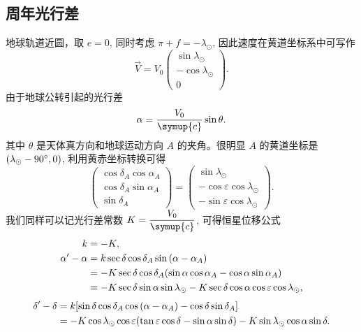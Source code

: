 \documentclass[UTF8, 12pt, a4paper, oneside, onecolumn, fontset=none]{ctexart}
\begin{document}
\subsection{周年光行差}
地球轨道近圆，取 $e=0$, 同时考虑 $\pi+f=-\lambda_{\odot}$, 因此速度在黄道坐标系中可写作
\begin{equation}
\vec{V}=V_{0}\begin{pmatrix}
\sin{\lambda_{\odot}}\\
-\cos{\lambda_{\odot}}\\
0
\end{pmatrix}.
\end{equation}
由于地球公转引起的光行差
\begin{equation}
\alpha=\frac{V_{0}}{\symup{c}}\sin{\theta}.
\end{equation}
其中 $\theta$ 是天体真方向和地球运动方向 $A$ 的夹角。很明显 $A$ 的黄道坐标是 $\mleft(\lambda_{\odot}-\ang{90;;}, 0\mright)$, 利用黄赤坐标转换可得
\begin{equation}
\begin{pmatrix}
\cos{\delta_{A}}\cos{\alpha_{A}}\\
\cos{\delta_{A}}\sin{\alpha_{A}}\\
\sin{\delta_{A}}
\end{pmatrix}=\begin{pmatrix}
\sin{\lambda_{\odot}}\\
-\cos{\varepsilon}\cos{\lambda_{\odot}}\\
-\sin{\varepsilon}\cos{\lambda_{\odot}}
\end{pmatrix}.
\end{equation}
我们同样可以记光行差常数 $K=\dfrac{V_{0}}{\symup{c}}$, 可得恒星位移公式
\begin{align}
k&=-K,\\
\alpha'-\alpha&=k\sec{\delta}\cos{\delta_{A}}\sin{\mleft(\alpha-\alpha_{A}\mright)}\notag\\
&=-K\sec{\delta}\cos{\delta_{A}}\mleft(\sin{\alpha}\cos{\alpha_{A}}-\cos{\alpha}\sin{\alpha_{A}}\mright)\notag\\
&=-K\sec{\delta}\sin{\alpha}\sin{\lambda_{\odot}}-K\sec{\delta}\cos{\alpha}\cos{\varepsilon}\cos{\lambda_{\odot}},
\end{align}
\begin{align}
\delta'-\delta&=k\mleft[\sin{\delta}\cos{\delta_{A}}\cos{\mleft(\alpha-\alpha_{A}\mright)}-\cos{\delta}\sin{\delta_{A}}\mright]\notag\\
&=-K\cos{\lambda_{\odot}}\cos{\varepsilon}\mleft(\tan{\varepsilon}\cos{\delta}-\sin{\alpha}\sin{\delta}\mright)-K\sin{\lambda_{\odot}}\cos{\alpha}\sin{\delta}.
\end{align}
\end{document}
